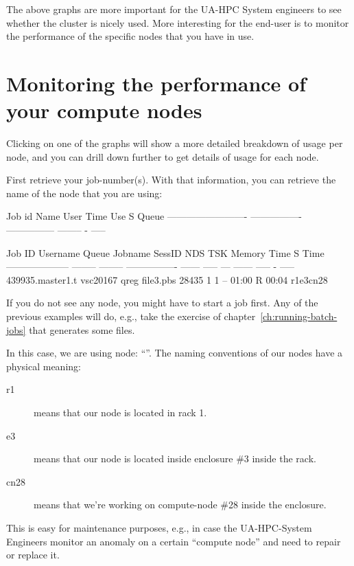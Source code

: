 The above graphs are more important for the UA-HPC System engineers to see
whether the cluster is nicely used. More interesting for the end-user is to
monitor the performance of the specific nodes that you have in use.

\section{Monitoring the performance of your compute nodes}

Clicking on one of the graphs will show a more detailed breakdown of usage per
node, and you can drill down further to get details of usage for each node.

First retrieve your job-number(s). With that information, you can retrieve the
name of the node that you are using:

\begin{prompt}
Job id                    Name             User            Time Use S Queue
------------------------- ---------------- --------------- -------- - -----

Job ID               Username Queue    Jobname          SessID NDS   TSK Memory Time  S Time
-------------------- -------- -------- ---------------- ------ ----- --- ------ ----- - -----
439935.master1.t     vsc20167 qreg     file3.pbs         28435     1   1    --  01:00 R 00:04
   r1e3cn28
\end{prompt}

If you do not see any node, you might have to start a job first. Any of the
previous examples will do, e.g., take the exercise of chapter~\ref{ch:running-batch-jobs} that generates
some files.


In this case, we are using node: ``''.
The naming conventions of our nodes have a physical meaning:

\begin{description}
  \item[r1] means that our node is located in rack 1.
  \item[e3] means that our node is located inside enclosure \#3 inside the rack.
  \item[cn28] means that we're working on compute-node \#28 inside the enclosure.
\end{description}

This is easy for maintenance purposes, e.g., in case the UA-HPC-System
Engineers monitor an anomaly on a certain ``compute node'' and need to repair
or replace it.

